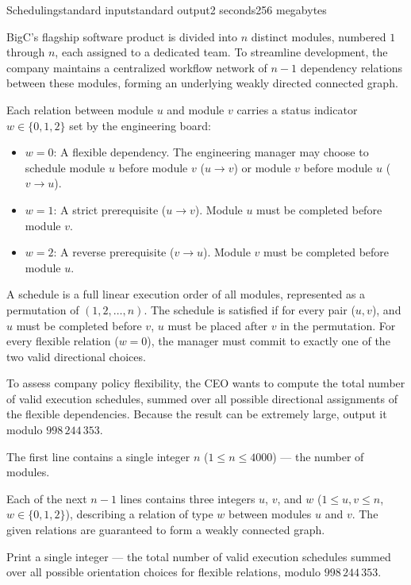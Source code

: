 \begin{problem}{Scheduling}{standard input}{standard output}{2 seconds}{256 megabytes}

BigC's flagship software product is divided into $n$ distinct modules, numbered $1$ through $n$, each assigned to a dedicated team. 
To streamline development, the company maintains a centralized workflow network of $n - 1$ dependency relations between these modules, forming an underlying weakly directed connected graph.

Each relation between module $u$ and module $v$ carries a status indicator $w \in \{0, 1, 2\}$ set by the engineering board:

\begin{itemize}
  \item $w = 0$: A flexible dependency. The engineering manager may choose to schedule module $u$ before module $v$ ($u \to v$) or module $v$ before module $u$ ($v \to u$).
  \item $w = 1$: A strict prerequisite ($u \to v$). Module $u$ must be completed before module $v$.
  \item $w = 2$: A reverse prerequisite ($v \to u$). Module $v$ must be completed before module $u$.
\end{itemize}

A schedule is a full linear execution order of all modules, represented as a permutation of $(1, 2, \dots, n)$. The schedule is satisfied if for every pair ($u, v$), and $u$ must be completed before $v$, $u$ must be placed after $v$ in the permutation. For every flexible relation ($w = 0$), the manager must commit to exactly one of the two valid directional choices.

To assess company policy flexibility, the CEO wants to compute the total number of valid execution schedules, summed over all possible directional assignments of the flexible dependencies. Because the result can be extremely large, output it modulo $998\,244\,353$.

\InputFile
The first line contains a single integer $n$ ($1 \le n \le 4000$) --- the number of modules.

Each of the next $n - 1$ lines contains three integers $u$, $v$, and $w$ ($1 \le u, v \le n$, $w \in \{0, 1, 2\}$), describing a relation of type $w$ between modules $u$ and $v$. The given relations are guaranteed to form a weakly connected graph.

\OutputFile
Print a single integer --- the total number of valid execution schedules summed over all possible orientation choices for flexible relations, modulo $998\,244\,353$.


\end{problem}
